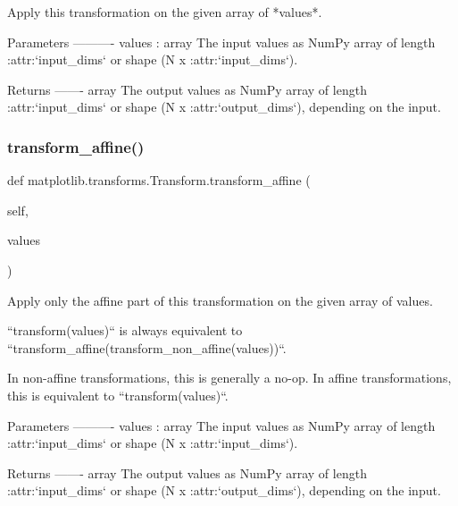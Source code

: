\begin{DoxyVerb}Apply this transformation on the given array of *values*.

Parameters
----------
values : array
    The input values as NumPy array of length :attr:`input_dims` or
    shape (N x :attr:`input_dims`).

Returns
-------
array
    The output values as NumPy array of length :attr:`input_dims` or
    shape (N x :attr:`output_dims`), depending on the input.
\end{DoxyVerb}
 \mbox{\label{classmatplotlib_1_1transforms_1_1Transform_aae16cba4769018c803bf591dfd01bae1}} 
\subsubsection{\texorpdfstring{transform\+\_\+affine()}{transform\_affine()}}
{\footnotesize\ttfamily def matplotlib.\+transforms.\+Transform.\+transform\+\_\+affine (\begin{DoxyParamCaption}\item[{}]{self,  }\item[{}]{values }\end{DoxyParamCaption})}

\begin{DoxyVerb}Apply only the affine part of this transformation on the
given array of values.

``transform(values)`` is always equivalent to
``transform_affine(transform_non_affine(values))``.

In non-affine transformations, this is generally a no-op.  In
affine transformations, this is equivalent to
``transform(values)``.

Parameters
----------
values : array
    The input values as NumPy array of length :attr:`input_dims` or
    shape (N x :attr:`input_dims`).

Returns
-------
array
    The output values as NumPy array of length :attr:`input_dims` or
    shape (N x :attr:`output_dims`), depending on the input.
\end{DoxyVerb}
 \mbox{\label{classmatplotlib_1_1transforms_1_1Transform_ae40bef230e0a307b714546a64e7b1ede}} 
